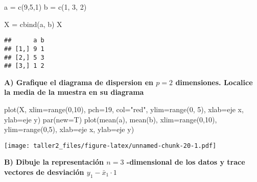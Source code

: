 \documentclass[
]{article}
\newenvironment{Shaded}{\begin{snugshade}}{\end{snugshade}}
\newcommand{\AttributeTok}[1]{\textcolor[rgb]{0.77,0.63,0.00}{#1}}
\newcommand{\DecValTok}[1]{\textcolor[rgb]{0.00,0.00,0.81}{#1}}
\newcommand{\FunctionTok}[1]{\textcolor[rgb]{0.00,0.00,0.00}{#1}}
\newcommand{\NormalTok}[1]{#1}
\newcommand{\OtherTok}[1]{\textcolor[rgb]{0.56,0.35,0.01}{#1}}
\newcommand{\StringTok}[1]{\textcolor[rgb]{0.31,0.60,0.02}{#1}}
\begin{document}
\begin{Shaded}
\begin{Highlighting}[]
\NormalTok{a }\OtherTok{=} \FunctionTok{c}\NormalTok{(}\DecValTok{9}\NormalTok{,}\DecValTok{5}\NormalTok{,}\DecValTok{1}\NormalTok{)}
\NormalTok{b }\OtherTok{=} \FunctionTok{c}\NormalTok{(}\DecValTok{1}\NormalTok{, }\DecValTok{3}\NormalTok{, }\DecValTok{2}\NormalTok{)}

\NormalTok{X }\OtherTok{=} \FunctionTok{cbind}\NormalTok{(a, b)}
\NormalTok{X}
\end{Highlighting}
\end{Shaded}

\begin{verbatim}
##      a b
## [1,] 9 1
## [2,] 5 3
## [3,] 1 2
\end{verbatim}

\textbf{A) Grafique el diagrama de dispersion en \(p=2\) dimensiones.
Localice la media de la muestra en su diagrama}

\begin{Shaded}
\begin{Highlighting}[]
\FunctionTok{plot}\NormalTok{(X, }\AttributeTok{xlim=}\FunctionTok{range}\NormalTok{(}\DecValTok{0}\NormalTok{,}\DecValTok{10}\NormalTok{), }\AttributeTok{pch=}\DecValTok{19}\NormalTok{, }\AttributeTok{col=}\StringTok{"red"}\NormalTok{,}
     \AttributeTok{ylim=}\FunctionTok{range}\NormalTok{(}\DecValTok{0}\NormalTok{, }\DecValTok{5}\NormalTok{), }\AttributeTok{xlab=}\StringTok{\textquotesingle{}eje x\textquotesingle{}}\NormalTok{, }\AttributeTok{ylab=}\StringTok{\textquotesingle{}eje y\textquotesingle{}}\NormalTok{)}
\FunctionTok{par}\NormalTok{(}\AttributeTok{new=}\NormalTok{T)}
\FunctionTok{plot}\NormalTok{(}\FunctionTok{mean}\NormalTok{(a), }\FunctionTok{mean}\NormalTok{(b), }\AttributeTok{xlim=}\FunctionTok{range}\NormalTok{(}\DecValTok{0}\NormalTok{,}\DecValTok{10}\NormalTok{), }\AttributeTok{ylim=}\FunctionTok{range}\NormalTok{(}\DecValTok{0}\NormalTok{,}\DecValTok{5}\NormalTok{), }\AttributeTok{xlab=}\StringTok{\textquotesingle{}eje x\textquotesingle{}}\NormalTok{, }\AttributeTok{ylab=}\StringTok{\textquotesingle{}eje y\textquotesingle{}}\NormalTok{)}
\end{Highlighting}
\end{Shaded}

\texttt{[image: taller2\_files/figure-latex/unnamed-chunk-20-1.pdf]}

\textbf{B) Dibuje la representación \(n=3\) -dimensional de los datos y
trace vectores de desviación \(y_{1} - \bar{x}_{1} \cdot 1\)}
\end{document}
